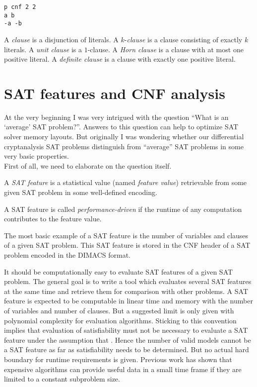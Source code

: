 \renewcommand{\lstlistingname}{Listing}  %
\begin{lstlisting}[caption={Display~\ref{eq:xor} represented in DIMACS format}]
p cnf 2 2
a b
-a -b
\end{lstlisting}

\begin{defi}
  A \emph{clause} is a disjunction of literals.
  A $k$-\emph{clause} is a clause consisting of exactly $k$ literals.
  A \emph{unit clause} is a $1$-clause.
  A \emph{Horn clause} is a clause with at most one positive literal.
  A \emph{definite clause} is a clause with exactly one positive literal.
\end{defi}

\section{SAT features and CNF analysis}
\label{sec:sat-features}
%
At the very beginning I was very intrigued with the question
\enquote{What is an \enquote{average} SAT problem?}. Answers to this
question can help to optimize SAT solver memory layouts.
But originally I was wondering whether our differential cryptanalysis
SAT problems distinguish from \enquote{average} SAT problems in some
very basic properties. \\
First of all, we need to elaborate on the question itself.

\begin{defi}
  A \emph{SAT feature} is a statistical value (named \emph{feature value})
  retrievable from some given SAT problem in some well-defined encoding.

  A SAT feature is called \emph{performance-driven} if the runtime of any
  computation contributes to the feature value.
\end{defi}

The most basic example of a SAT feature is the number of variables and clauses
of a given SAT problem. This SAT feature is stored in the CNF header of a SAT
problem encoded in the DIMACS format.

It should be computationally easy to evaluate SAT features of a given SAT problem.
The general goal is to write a tool which evaluates several SAT features at the same
time and retrieve them for comparison with other problems. A SAT feature
is expected to be computable in linear time and memory with the number of variables
and number of clauses. But a suggested limit is only given with polynomial complexity
for evaluation algorithms. Sticking to this convention implies that evaluation
of satisfiability must not be necessary to evaluate a SAT feature under the
assumption that \cPneqNP. Hence the number of valid models cannot be a SAT feature
as far as satisfiability needs to be determined. But no actual hard boundary for
runtime requirements is given. Previous work has shown that expensive algorithms
can provide useful data in a small time frame if they are limited to a constant
subproblem size.

